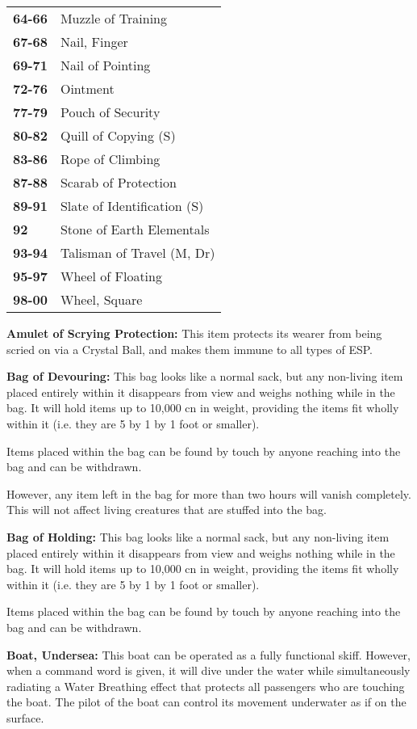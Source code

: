 \begin{multicols*}{2}
\begin {table}[H]
\begin{tabularx}{\columnwidth}{>{\bfseries}YY}
	64-66 & Muzzle of Training\\
	67-68 & Nail, Finger\\
	69-71 & Nail of Pointing\\
	72-76 & Ointment\\
	77-79 & Pouch of Security\\
	80-82 & Quill of Copying (S)\\
	83-86 & Rope of Climbing\\
	87-88 & Scarab of Protection\\
	89-91 & Slate of Identification (S)\\
	92 & Stone of Earth Elementals\\
	93-94 & Talisman of Travel (M, Dr)\\
	95-97 & Wheel of Floating\\
	98-00 & Wheel, Square
  \end {tabularx}
\end {table}

\textbf{Amulet of Scrying Protection:} This item protects its wearer from being scried on via a Crystal Ball, and makes them immune to all types of ESP.

\textbf{Bag of Devouring:} This bag looks like a normal sack, but any non-living item placed entirely within it disappears from view and weighs nothing while in the bag. It will hold items up to 10,000 cn in weight, providing the items fit wholly within it (i.e. they are 5 by 1 by 1 foot or smaller).

Items placed within the bag can be found by touch by anyone reaching into the bag and can be withdrawn.

However, any item left in the bag for more than two hours will vanish completely. This will not affect living creatures that are stuffed into the bag.

\textbf{Bag of Holding:} This bag looks like a normal sack, but any non-living item placed entirely within it disappears from view and weighs nothing while in the bag. It will hold items up to 10,000 cn in weight, providing the items fit wholly within it (i.e. they are 5 by 1 by 1 foot or smaller).

Items placed within the bag can be found by touch by anyone reaching into the bag and can be withdrawn.

\textbf{Boat, Undersea:} This boat can be operated as a fully functional skiff. However, when a command word is given, it will dive under the water while simultaneously radiating a Water Breathing effect that protects all passengers who are touching the boat. The pilot of the boat can control its movement underwater as if on the surface.


\end{multicols*}
